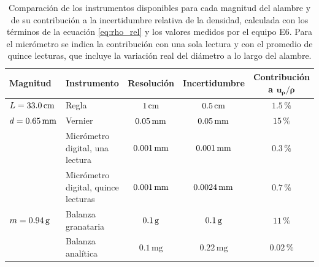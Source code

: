 \begin{table}[H]
    \centering
    \small
    \caption{Comparación de los instrumentos disponibles para cada magnitud del alambre y de su contribución a la incertidumbre relativa de la densidad, calculada con los términos de la ecuación \eqref{eq:rho_rel} y los valores medidos por el equipo E6. Para el micrómetro se indica la contribución con una sola lectura y con el promedio de quince lecturas, que incluye la variación real del diámetro a lo largo del alambre.}
    \label{tab:seleccion}
    \begin{tabular}{l l c c c}
        \toprule
        \textbf{Magnitud} & \textbf{Instrumento} & \textbf{Resolución} & \textbf{Incertidumbre} & \textbf{Contribución a} $\bm{u_\rho/\rho}$ \\
        \midrule
        $L = 33.0\,\mathrm{cm}$ & Regla                              & $1\,\mathrm{cm}$              & $0.5\,\mathrm{cm}$              & $1.5\,\%$ \\
        \midrule
        $d = 0.65\,\mathrm{mm}$ & Vernier                            & $0.05\,\mathrm{mm}$           & $0.05\,\mathrm{mm}$             & $15\,\%$ \\
                      & Micrómetro digital, una lectura    & $0.001\,\mathrm{mm}$          & $0.001\,\mathrm{mm}$            & $0.3\,\%$ \\
                      & Micrómetro digital, quince lecturas & $0.001\,\mathrm{mm}$         & $0.0024\,\mathrm{mm}$           & $0.7\,\%$ \\
        \midrule
        $m = 0.94\,\mathrm{g}$  & Balanza granataria                 & $0.1\,\mathrm{g}$             & $0.1\,\mathrm{g}$               & $11\,\%$ \\
                      & Balanza analítica                  & $0.1\,\mathrm{mg}$  & $0.22\,\mathrm{mg}$   & $0.02\,\%$ \\
        \bottomrule
    \end{tabular}
\end{table}

